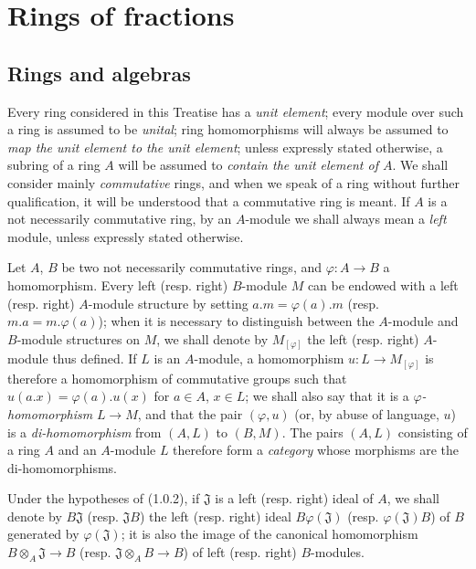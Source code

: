 \section{Rings of fractions}
\label{section:0.1}

\setcounter{subsection}{-1}
\subsection{Rings and algebras}
\label{subsection:0.1.0}

\begin{env}[1.0.1]
\label{0.1.0.1}
Every ring considered in this Treatise has a \emph{unit element};
every module over such a ring is assumed to be \emph{unital}; ring homomorphisms will always be assumed to \emph{map the unit element to the unit element}; unless expressly stated otherwise, a subring of a ring $A$ will be assumed to \emph{contain the unit element of $A$}.
We shall consider mainly \emph{commutative} rings, and when we speak of a ring without further qualification, it will be understood that a commutative ring is meant.
If $A$ is a not necessarily commutative ring, by an $A$-module we shall always mean a \emph{left} module, unless expressly stated otherwise.
\end{env}

\begin{env}[1.0.2]
\label{0.1.0.2}
Let $A$, $B$ be two not necessarily commutative rings, and $\varphi:A\to B$ a homomorphism.
Every left (resp. right) $B$-module $M$ can be endowed with a left (resp. right) $A$-module structure by setting $a.m=\varphi(a).m$ (resp. $m.a=m.\varphi(a)$); when it is necessary to distinguish between the $A$-module and $B$-module structures on $M$, we shall denote by $M_{[\varphi]}$ the left (resp. right) $A$-module thus defined.
If $L$ is an $A$-module, a homomorphism $u:L\to M_{[\varphi]}$ is therefore a homomorphism of commutative groups such that $u(a.x)=\varphi(a).u(x)$ for $a\in A$, $x\in L$; we shall also say that it is a \emph{$\varphi$-homomorphism} $L\to M$, and that the pair $(\varphi,u)$ (or, by abuse of language, $u$) is a \emph{di-homomorphism} from $(A,L)$ to $(B,M)$.
The pairs $(A,L)$ consisting of a ring $A$ and an $A$-module $L$ therefore form a \emph{category} whose morphisms are the di-homomorphisms.
\end{env}

\begin{env}[1.0.3]
\label{0.1.0.3}
Under the hypotheses of (1.0.2), if $\mathfrak{J}$ is a left (resp. right) ideal of $A$, we shall denote by $B\mathfrak{J}$ (resp. $\mathfrak{J}B$) the left (resp. right) ideal $B\varphi(\mathfrak{J})$ (resp. $\varphi(\mathfrak{J})B$) of $B$ generated by $\varphi(\mathfrak{J})$; it is also the image of the canonical homomorphism $B\otimes_A\mathfrak{J}\to B$ (resp. $\mathfrak{J}\otimes_A B\to B$) of left (resp. right) $B$-modules.
\end{env}


